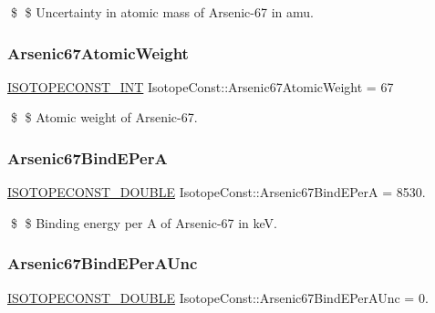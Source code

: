 \$ \$ Uncertainty in atomic mass of Arsenic-\/67 in amu. \mbox{\label{group___isotope_const-_arsenic-_as67_ga68fc1ed209c33ec598dcdf5850f11881}} 
\subsubsection{\texorpdfstring{Arsenic67\+Atomic\+Weight}{Arsenic67AtomicWeight}}
{\footnotesize\ttfamily \mbox{\hyperlink{group___isotope_const-_macros_ga5f18360b3e99483a35c32d789e62621c}{I\+S\+O\+T\+O\+P\+E\+C\+O\+N\+S\+T\+\_\+\+I\+NT}} Isotope\+Const\+::\+Arsenic67\+Atomic\+Weight = 67}

\$ \$ Atomic weight of Arsenic-\/67. \mbox{\label{group___isotope_const-_arsenic-_as67_ga6e76a7e8b6a4ecb19e66b3c68af34c67}} 
\subsubsection{\texorpdfstring{Arsenic67\+Bind\+E\+PerA}{Arsenic67BindEPerA}}
{\footnotesize\ttfamily \mbox{\hyperlink{group___isotope_const-_macros_ga8f45a7272ce02c0b4c65c44636ed719a}{I\+S\+O\+T\+O\+P\+E\+C\+O\+N\+S\+T\+\_\+\+D\+O\+U\+B\+LE}} Isotope\+Const\+::\+Arsenic67\+Bind\+E\+PerA = 8530.}

\$ \$ Binding energy per A of Arsenic-\/67 in keV. \mbox{\label{group___isotope_const-_arsenic-_as67_ga32051d64e79e0dcda26b9d96eb20d391}} 
\subsubsection{\texorpdfstring{Arsenic67\+Bind\+E\+Per\+A\+Unc}{Arsenic67BindEPerAUnc}}
{\footnotesize\ttfamily \mbox{\hyperlink{group___isotope_const-_macros_ga8f45a7272ce02c0b4c65c44636ed719a}{I\+S\+O\+T\+O\+P\+E\+C\+O\+N\+S\+T\+\_\+\+D\+O\+U\+B\+LE}} Isotope\+Const\+::\+Arsenic67\+Bind\+E\+Per\+A\+Unc = 0.}

